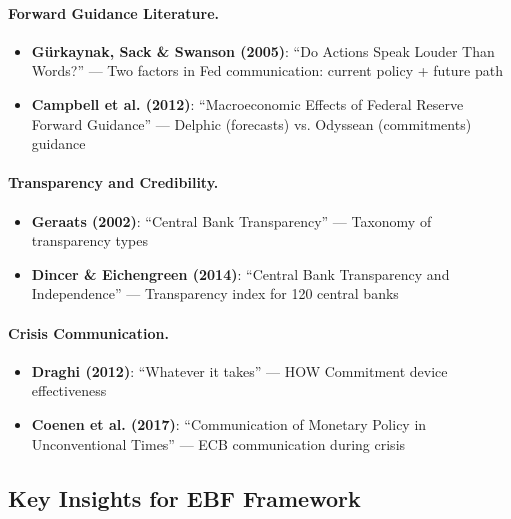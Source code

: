 \paragraph{Forward Guidance Literature.}
\begin{itemize}[nosep]
  \item \textbf{Gürkaynak, Sack \& Swanson (2005)}: ``Do Actions Speak Louder Than Words?'' ---
    Two factors in Fed communication: current policy + future path
  \item \textbf{Campbell et al. (2012)}: ``Macroeconomic Effects of Federal Reserve Forward Guidance'' ---
    Delphic (forecasts) vs. Odyssean (commitments) guidance
\end{itemize}

\paragraph{Transparency and Credibility.}
\begin{itemize}[nosep]
  \item \textbf{Geraats (2002)}: ``Central Bank Transparency'' --- Taxonomy of transparency types
  \item \textbf{Dincer \& Eichengreen (2014)}: ``Central Bank Transparency and Independence'' ---
    Transparency index for 120 central banks
\end{itemize}

\paragraph{Crisis Communication.}
\begin{itemize}[nosep]
  \item \textbf{Draghi (2012)}: ``Whatever it takes'' --- HOW Commitment device effectiveness
  \item \textbf{Coenen et al. (2017)}: ``Communication of Monetary Policy in Unconventional Times'' ---
    ECB communication during crisis
\end{itemize}

\subsection{Key Insights for EBF Framework}

